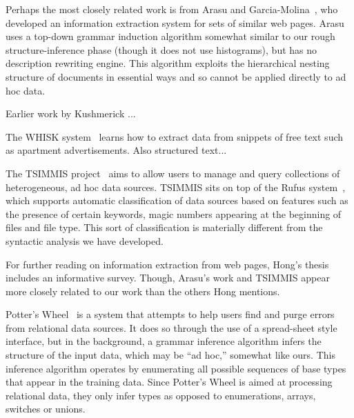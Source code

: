 Perhaps the most closely related work is from Arasu and 
Garcia-Molina~\cite{arasu+:sigmod03}, who developed an information
extraction system for sets of similar web pages.  
Arasu uses a top-down grammar induction
algorithm somewhat similar to our rough structure-inference phase
(though it does not use histograms),
but has no description rewriting engine.  
This algorithm exploits the hierarchical nesting
structure of \xml{} documents in essential ways
and so cannot be applied directly to ad hoc data.  


Earlier work by Kushmerick ...


The WHISK system~\cite{soderland:whisk} learns how to extract data
from snippets of free text such as apartment advertisements.  Also
structured text...


The TSIMMIS project~\cite{chawathe+:tsimmis} aims to
allow users to manage and query collections of heterogeneous, ad hoc
data sources.  TSIMMIS sits on top of the Rufus
system~\cite{shoens+:rufus}, which supports automatic classification
of data sources based on features such as the presence of certain
keywords, magic numbers appearing at the beginning of files and file
type.  
This sort of classification is materially
different from the syntactic analysis we have developed.


For further reading on
information extraction from web pages, Hong's
thesis~\cite{hong:thesis} includes an informative survey.  Though,
Arasu's work and TSIMMIS appear more closely related to our work than
the others Hong mentions.

Potter's Wheel~\cite{raman+:potterwheel} is a system that attempts to
help users find and purge errors from
relational data sources.  It does so through the use of a spread-sheet
style interface, but in the background, a grammar inference algorithm
infers the structure of the input data, which may be ``ad hoc,'' 
somewhat like ours.  This inference algorithm operates by
enumerating all possible sequences of base types that appear
in the training data.  
Since Potter's Wheel is aimed at processing
relational data, they only infer  types
as opposed to enumerations, arrays, switches or unions.  

